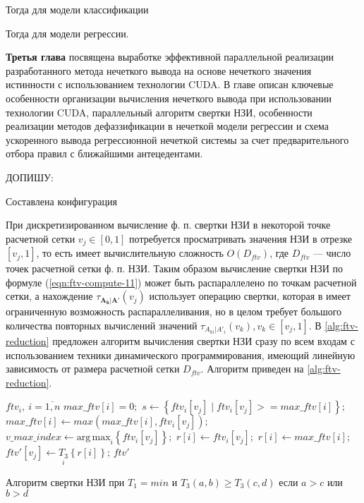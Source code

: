 Тогда для модели классификации

Тогда для модели регрессии.

\textbf{Третья глава} посвящена выработке эффективной параллельной реализации разработанного метода нечеткого вывода на основе нечеткого значения истинности с использованием технологии CUDA. В главе описан ключевые особенности организации вычисления нечеткого вывода при использовании технологии CUDA, параллельный алгоритм свертки НЗИ, особенности реализации методов дефаззификации в нечеткой модели регрессии и схема ускоренного вывода регрессионной нечеткой системы за счет предварительного отбора правил с ближайшими антецедентами.

{\color{red} ДОПИШУ:

Составлена конфигурация 

При дискретизированном вычисление ф. п. свертки НЗИ в некоторой точке расчетной сетки $v_j\in [0,1]$ потребуется просматривать значения НЗИ в отрезке $[v_j, 1]$, то есть имеет вычислительную сложность $O(D_{ftv})$, где $D_{ftv}$ --- число точек расчетной сетки ф. п. НЗИ. Таким образом вычисление свертки НЗИ по формуле (\ref{eqn:ftv-compute-11}) может быть распараллелено по точкам расчетной сетки, а нахождение $\tau_{\mathbf{A_k}|\mathbf{A'}}(v_j)$ использует операцию свертки, которая в имеет ограниченную возможность распараллеливания, но в целом требует большого количества повторных вычислений значений $\tau_{A_{ki}|A'_i}(v_k), v_k\in [v_j, 1]$. В \ref{alg:ftv-reduction} \cite{Karatach2024} предложен алгоритм вычисления свертки НЗИ сразу по всем входам с использованием техники динамического программирования, имеющий линейную зависимость от размера расчетной сетки $D_{ftv}$. Алгоритм приведен на \cref{alg:ftv-reduction}.
}

\begin{algorithm}
	\begin{algorithmic}
		\Require $ftv_i,\ i=\overline{1,n}$
		\State $max\_ftv[i] = 0;$
		\State $s \gets \left\{ftv_i[v_j] \mid ftv_i[v_j] >= max\_ftv[i]\right\};$
		\State $max\_ftv[i] \gets max(max\_ftv[i], ftv_i[v_j]);$
		\State $v\_max\_index \gets \mathrm{arg\,max}_i\left\{ftv_i[v_j]\right\};$
		\State $r[i] \gets ftv_{i}[v_j];$
		\Else
		\State $r[i] \gets max\_ftv[i];$
		\EndIf
		\State $ftv'[v_j] \gets \underset{i}{T_3}\left\{r[i]\right\}$;
		\EndFor
		\State \Return $ftv'$
	\end{algorithmic}
	\caption{Алгоритм свертки НЗИ при $T_1=min$ и $T_3(a, b) \ge T_3(c, d)$ если $a > c$ или $b > d$}
	\label{alg:ftv-reduction}
\end{algorithm}

